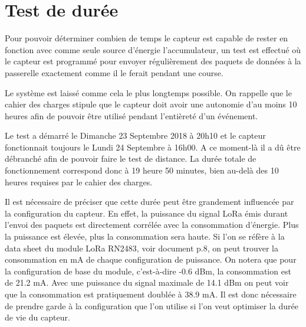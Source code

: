\section{Test de durée}

Pour pouvoir déterminer combien de temps le capteur est capable de rester en fonction avec comme seule source d'énergie l'accumulateur, un test est effectué  où le capteur est programmé pour envoyer régulièrement des paquets de données à la passerelle exactement comme il le ferait pendant une course.

Le système est laissé comme cela le plus longtemps possible. On rappelle que le cahier des charges stipule que le capteur doit avoir une autonomie d'au moins 10 heures afin de pouvoir être utilisé pendant l'entièreté d'un événement.

Le test a démarré le Dimanche 23 Septembre 2018 à 20h10 et le capteur fonctionnait toujours le Lundi 24 Septembre à 16h00. A ce moment-là il a dû être débranché afin de pouvoir faire le test de distance. La durée totale de fonctionnement correspond donc à 19 heure 50 minutes, bien au-delà des 10 heures requises par le cahier des charges.

Il est nécessaire de préciser que cette durée peut être grandement influencée par la configuration du capteur. En effet, la puissance du signal LoRa émis durant l'envoi des paquets est directement corrélée avec la consommation d'énergie. Plus la puissance est élevée, plus la consommation sera haute. Si l’on se réfère à la data sheet du module LoRa RN2483, voir document \cite{rn2483-datasheet-real} p.8, on peut trouver la consommation en mA de chaque configuration de puissance. On notera que pour la configuration de base du module, c'est-à-dire -0.6 dBm, la consommation est de 21.2 mA. Avec une puissance du signal maximale de 14.1 dBm on peut voir que la consommation est pratiquement doublée à 38.9 mA. Il est donc nécessaire de prendre garde à la configuration que l'on utilise si l'on veut optimiser la durée de vie du capteur.